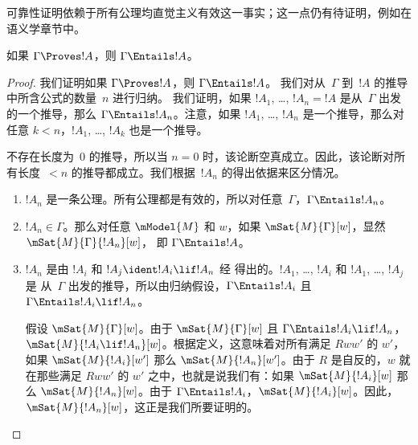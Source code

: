 \documentclass[../../../include/open-logic-section]{subfiles}
\begin{document}


\begin{editorial}
  可靠性证明依赖于所有公理均直觉主义有效这一事实；这一点仍有待证明，例如在语义学章节中。
\end{editorial}

\begin{thm}[可靠性]
  如果 $\Gamma \Proves !A$，则 $ \Gamma \Entails !A$。
\end{thm}

\begin{proof}
  我们证明如果 $\Gamma \Proves !A$，则 $\Gamma \Entails !A$。
  我们对从~$\Gamma$ 到~$!A$ 的推导中所含公式的数量~$n$ 进行归纳。
  我们证明，如果 $!A_1$, \dots, $!A_n = !A$ 是从~$\Gamma$ 出发的一个推导，那么 $\Gamma
  \Entails !A_n$。注意，如果 $!A_1$, \dots, $!A_n$ 是一个推导，那么对任意 $k<n$，$!A_1$, \dots, $!A_k$ 也是一个推导。

  不存在长度为~$0$ 的推导，所以当 $n=0$ 时，该论断空真成立。因此，该论断对所有长度~$<n$ 的推导都成立。我们根据~$!A_n$ 的得出依据来区分情况。

  \begin{enumerate}
  \item $!A_n$ 是一条公理。所有公理都是有效的，所以对任意~$\Gamma$，$\Gamma \Entails
    !A_n$。
  \item $!A_n \in \Gamma$。那么对任意 $\mModel{M}$ 和 $w$，如果
    $\mSat{M}{\Gamma}[w]$，显然 $\mSat{M}{\Gamma}{!A_n}[w]$，
    即 $\Gamma \Entails !A$。
  \item $!A_n$ 是由 $!A_i$ 和 $!A_j \ident !A_i \lif
    !A_n$ 经 \MP{} 得出的。$!A_1$, \dots, $!A_i$ 和 $!A_1$, \dots, $!A_j$ 是
    从~$\Gamma$ 出发的推导，所以由归纳假设，$\Gamma
    \Entails !A_i$ 且 $\Gamma \Entails !A_i \lif !A_n$。

    假设 $\mSat{M}{\Gamma}[w]$。由于 $\mSat{M}{\Gamma}[w]$ 且
    $\Gamma \Entails !A_i \lif !A_n$，$\mSat{M}{!A_i \lif
      !A_n}[w]$。根据定义，这意味着对所有满足
    $Rww'$ 的 $w'$，如果 $\mSat{M}{!A_i}[w']$ 那么 $\mSat{M}{!A_n}[w']$。由于
    $R$ 是自反的，$w$ 就在那些满足 $Rww'$ 的 $w'$ 之中，也就是说我们有：如果 $\mSat{M}{!A_i}[w]$ 那么 $\mSat{M}{!A_n}[w]$。由于
    $\Gamma \Entails !A_i$，$\mSat{M}{!A_i}[w]$。因此，
    $\mSat{M}{!A_n}[w]$，这正是我们所要证明的。
  \end{enumerate}
\end{proof}
\end{document}
